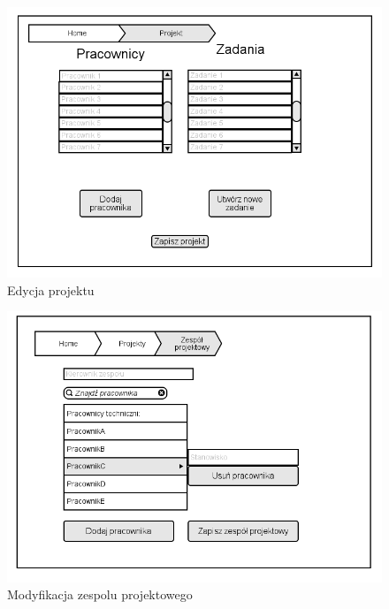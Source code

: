 \begin{figure}[H]
    \centering
    \includegraphics[scale=0.7]{diagramy/intefejsy/Projekt.png}
    \caption{Edycja projektu}
    \label{fig:usecase}
\end{figure}

\begin{figure}[H]
    \centering
    \includegraphics[scale=0.7]{diagramy/intefejsy/Modyfikacja_zespolu_projektowego.png}
    \caption{Modyfikacja zespolu projektowego}
    \label{fig:usecase}
\end{figure}

